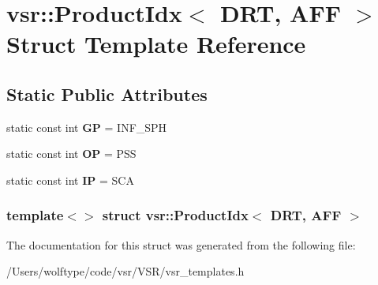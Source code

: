 \hypertarget{structvsr_1_1_product_idx_3_01_d_r_t_00_01_a_f_f_01_4}{\section{vsr\-:\-:Product\-Idx$<$ D\-R\-T, A\-F\-F $>$ Struct Template Reference}
\label{structvsr_1_1_product_idx_3_01_d_r_t_00_01_a_f_f_01_4}
}
\subsection*{Static Public Attributes}
\begin{DoxyCompactItemize}
\item 
\hypertarget{structvsr_1_1_product_idx_3_01_d_r_t_00_01_a_f_f_01_4_a8fd8d01d7469fe457bb79df1f63d5016}{static const int {\bfseries G\-P} = I\-N\-F\-\_\-\-S\-P\-H}\label{structvsr_1_1_product_idx_3_01_d_r_t_00_01_a_f_f_01_4_a8fd8d01d7469fe457bb79df1f63d5016}

\item 
\hypertarget{structvsr_1_1_product_idx_3_01_d_r_t_00_01_a_f_f_01_4_ab66791124ecde65100ca49759a5b320a}{static const int {\bfseries O\-P} = P\-S\-S}\label{structvsr_1_1_product_idx_3_01_d_r_t_00_01_a_f_f_01_4_ab66791124ecde65100ca49759a5b320a}

\item 
\hypertarget{structvsr_1_1_product_idx_3_01_d_r_t_00_01_a_f_f_01_4_a54e8ab0e41af63c10dc2420c8ed64e69}{static const int {\bfseries I\-P} = S\-C\-A}\label{structvsr_1_1_product_idx_3_01_d_r_t_00_01_a_f_f_01_4_a54e8ab0e41af63c10dc2420c8ed64e69}

\end{DoxyCompactItemize}
\subsubsection*{template$<$$>$ struct vsr\-::\-Product\-Idx$<$ D\-R\-T, A\-F\-F $>$}



The documentation for this struct was generated from the following file\-:\begin{DoxyCompactItemize}
\item 
/\-Users/wolftype/code/vsr/\-V\-S\-R/vsr\-\_\-templates.\-h\end{DoxyCompactItemize}

